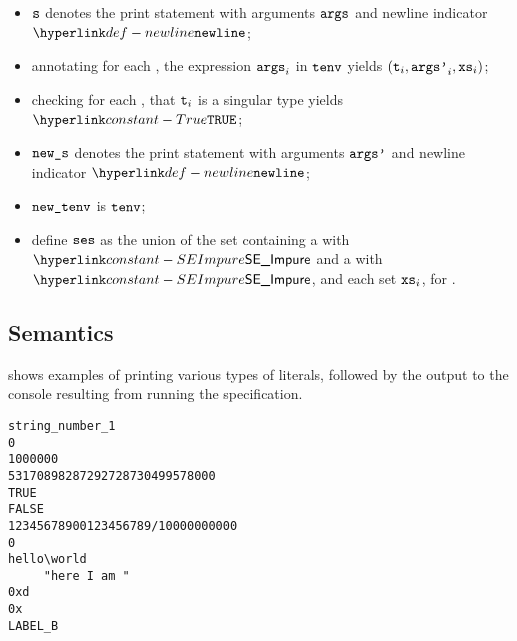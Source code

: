 \ProseParagraph
\AllApply
\begin{itemize}
  \item $\vs$ denotes the print statement with arguments $\vargs$ and newline indicator $\vnewline$;
  \item annotating for each , the expression $\vargs_i$ in $\tenv$ yields $(\vt_i, \vargsp_i, \vxs_i)$\ProseOrTypeError;
  \item checking for each , that $\vt_i$ is a singular type yields $\True$\ProseOrTypeError;
  \item $\news$ denotes the print statement with arguments $\vargsp$ and newline indicator $\vnewline$;
  \item $\newtenv$ is $\tenv$;
  \item define $\vses$ as the union of the set containing a \GlobalEffectTerm{} with \purity{} $\SEImpure$ and a \LocalEffectTerm{} with \purity{} $\SEImpure$, and each set $\vxs_i$, for .
\end{itemize}

\FormallyParagraph
\begin{mathpar}
\end{mathpar}

\subsection{Semantics}

 shows examples of printing various types of literals,
followed by the output to the console resulting from running the specification.
\begin{Verbatim}[fontsize=\footnotesize, frame=single]
string_number_1
0
1000000
53170898287292728730499578000
TRUE
FALSE
12345678900123456789/10000000000
0
hello\world
	 "here I am "
0xd
0x
LABEL_B
\end{Verbatim}

